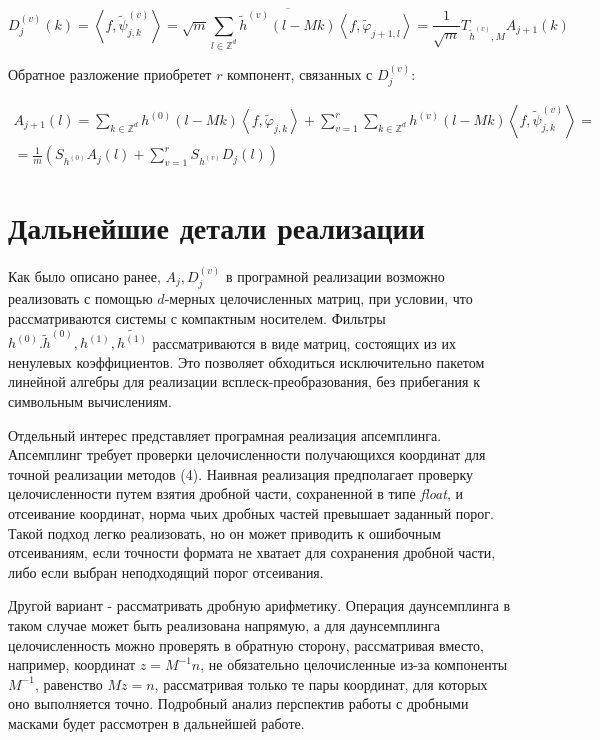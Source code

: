 \documentclass[a4paper,article,14pt]{extarticle}
\begin{document}
\[
	D_j^{(v)} (k) = \left< f, \widetilde{\psi}_{j,k}^{(v)}\right> = \sqrt{m} \sum_{l \in \mathbb{Z}^d} \overline{\widetilde{h}^{(v)}(l-Mk)} \left< f, \widetilde{\varphi}_{j+1,l}\right> = \frac{1}{\sqrt{m}} T_{\widetilde{h}^{(v)},M} A_{j+1} (k)
\]

Обратное разложение приобретет $r$ компонент, связанных с $D_j^{(v)}$:

\[
	\begin{split}
		A_{j+1} (l) = \sum_{k \in \mathbb{Z}^d}h^{(0)}(l-Mk) \left< f, \widetilde{\varphi}_{j,k}\right> + \sum_{v=1}^r\sum_{k \in \mathbb{Z}^d} h^{(v)} (l-Mk) \left< f, \widetilde{\psi}_{j,k}^{(v)}\right> = \\
		= \frac{1}{m} \left( S_{h^{(0)}} A_j (l) + \sum_{v=1}^rS_{h^{(v)}} D_j (l)\right)
\end{split}
\]
\pagebreak

\section{Дальнейшие детали реализации}
Как было описано ранее, $A_j, D_j^{(v)}$ в програмной реализации возможно реализовать с помощью $d$-мерных целочисленных матриц, при условии, что рассматриваются системы с компактным носителем. Фильтры $h^{(0)}. \widetilde{h}^{(0)}, h^{(1)}, \widetilde{h^{(1)}}$ рассматриваются в виде матриц, состоящих из их ненулевых коэффициентов. Это позволяет обходиться исключительно пакетом линейной алгебры для реализации всплеск-преобразования, без прибегания к символьным вычислениям.

Отдельный интерес представляет програмная реализация апсемплинга. Апсемплинг требует проверки целочисленности получающихся координат для точной реализации методов (4). Наивная реализация предполагает проверку целочисленности путем взятия дробной части, сохраненной в типе \textit{float}, и отсеивание координат, норма чьих дробных частей превышает заданный порог. Такой подход легко реализовать, но он может приводить к ошибочным отсеиваниям, если точности формата не хватает для сохранения дробной части, либо если выбран неподходящий порог отсеивания.

Другой вариант - рассматривать дробную арифметику. Операция даунсемплинга в таком случае может быть реализована напрямую, а для даунсемплинга целочисленность можно проверять в обратную сторону, рассматривая вместо, например, координат $z=M^{-1} n$, не обязательно целочисленные из-за компоненты $M^{-1}$, равенство $Mz = n$, рассматривая только те пары координат, для которых оно выполняется точно. Подробный анализ перспектив работы с дробными масками будет рассмотрен в дальнейшей работе.
\end{document}
